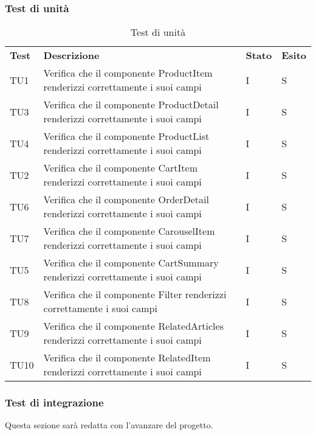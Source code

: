 \subsubsection{Test di unità}
\begin{center}
    \centering
    \renewcommand{\arraystretch}{1.8}
    \label{tab:TestUnita}
    \begin{longtable}[!h]{p{60px} p{240px} p{35px} p{35px}}
        \caption{Test di unità}                                                                                                                               \\
        \rowcolor{logo!70}
        \textbf{Test}   & \textbf{Descrizione}                                                                                & \textbf{Stato} & \textbf{Esito} \\
        TU1 & Verifica che il componente ProductItem renderizzi correttamente i suoi campi & I & S \\
        TU3 & Verifica che il componente ProductDetail renderizzi correttamente i suoi campi & I & S \\
        TU4 & Verifica che il componente ProductList renderizzi correttamente i suoi campi & I & S \\
        TU2 & Verifica che il componente CartItem renderizzi correttamente i suoi campi & I & S \\
        TU6 & Verifica che il componente OrderDetail renderizzi correttamente i suoi campi & I & S \\
        TU7 & Verifica che il componente CarouselItem renderizzi correttamente i suoi campi & I & S \\
        TU5 & Verifica che il componente CartSummary renderizzi correttamente i suoi campi & I & S \\
        TU8 & Verifica che il componente Filter renderizzi correttamente i suoi campi & I & S \\
        TU9 & Verifica che il componente RelatedArticles renderizzi correttamente i suoi campi & I & S \\
        TU10 & Verifica che il componente RelatedItem renderizzi correttamente i suoi campi & I & S \\
    \end{longtable}
\end{center}

\subsubsection{Test di integrazione}
Questa sezione sarà redatta con l'avanzare del progetto.
\pagebreak
